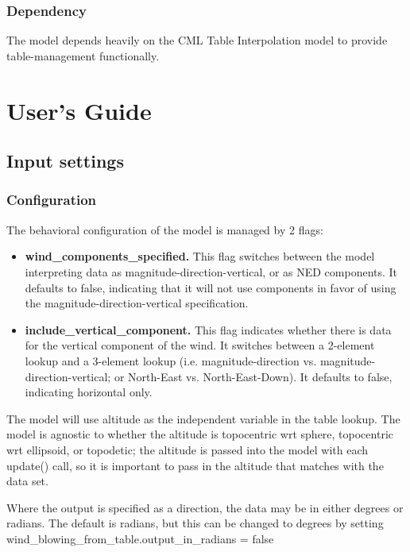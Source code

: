 \documentclass[11pt,fleqn]{report}
\begin{document}
\subsection{Dependency}
The model depends heavily on the CML Table Interpolation model to provide table-management functionally.

\chapter{User's Guide}
\section{Input settings}
\subsection{Configuration}
The behavioral configuration of the model is managed by 2 flags:
\begin{itemize}
   \item \textbf{wind\_components\_specified.}  This flag switches between the model interpreting data as magnitude-direction-vertical, or as NED components.  It defaults to false, indicating that it will not use components in favor of using the magnitude-direction-vertical specification.
   \item \textbf{include\_vertical\_component.}  This flag indicates whether there is data for the vertical component of the wind.  It switches between a 2-element lookup and a 3-element lookup (i.e. magnitude-direction vs. magnitude-direction-vertical; or North-East vs. North-East-Down).  It defaults to false, indicating horizontal only.
\end{itemize}
 The model will use altitude as the independent variable in the table lookup.  The model is agnostic to whether the altitude is topocentric wrt sphere, topocentric wrt ellipsoid, or topodetic; the altitude is passed into the model with each update() call, so it is important to pass in the altitude that matches with the data set.

Where the output is specified as a direction, the data may be in either degrees or radians.  The default is radians, but this can be changed to degrees by setting\\
\indent\hspace{1cm} \colorbox{customorange}{wind\_blowing\_from\_table.output\_in\_radians = false}
 
\end{document}
